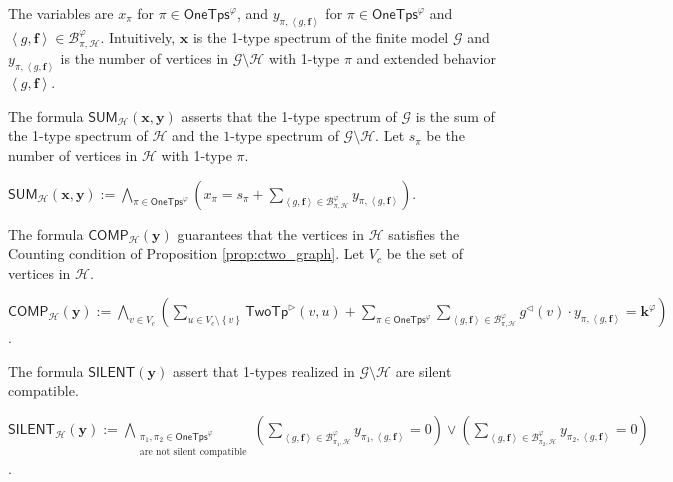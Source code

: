 \documentclass[10pt,a4paper]{article}
\theoremstyle{definition}
\theoremstyle{remark}
\newcommand{\cB}{\mathcal{B}}
\newcommand{\cG}{\mathcal{G}}
\newcommand{\cH}{\mathcal{H}}
\newcommand{\bff}{\mathbf{f}}
\newcommand{\bfk}{\mathbf{k}}
\newcommand{\bfx}{\mathbf{x}}
\newcommand{\bfy}{\mathbf{y}}
\newcommand{\twotypeof}{\mathsf{TwoTp}}
\newcommand{\onetypes}{\mathsf{OneTps}}
\newcommand{\set}[1]         {\left\{ #1 \right\}}
\newcommand{\tuple}[1]       {\left\langle #1 \right\rangle}
\newcommand{\trif} {\triangleright}
\newcommand{\trib} {\triangleleft}
\newcommand{\summ}  {\mathsf{SUM}}
\newcommand{\comp}  {\mathsf{COMP}}
\newcommand{\silent}  {\mathsf{SILENT}}
\begin{document}
\begin{compactitem}
    \item The variables are $x_\pi$ for $\pi \in \onetypes^\varphi$,
    and $y_{\pi, \tuple{g, \bff}}$ for $\pi \in \onetypes^\varphi$ and $\tuple{g, \bff} \in \cB^\varphi_{\pi, \cH}$.
    Intuitively, $\bfx$ is the 1-type spectrum of the finite model $\cG$ and $y_{\pi, \tuple{g, \bff}}$ is the number of vertices in $\cG \setminus \cH$ with 1-type $\pi$ and extended behavior $\tuple{g, \bff}$.
    \item
    The formula $\summ_{\cH}(\bfx, \bfy)$ asserts that the 1-type spectrum of $\cG$ is the sum of the 1-type spectrum of $\cH$ and 
    the $1$-type spectrum of $\cG \setminus \cH$.
    Let $s_\pi$ be the number of vertices in $\cH$ with 1-type $\pi$. \\
    \begin{notsotiny}
    $\displaystyle\summ_{\cH}(\bfx, \bfy)
         := 
     \bigwedge_{\pi \in \onetypes^\varphi} \left(x_\pi = s_\pi + \sum_{\tuple{g, \bff} \in \cB^{\varphi}_{\pi, \cH}} y_{\pi, \tuple{g, \bff}}\right)$.
    \end{notsotiny}
    \item
    The formula $\comp_{\cH}(\bfy)$ guarantees that the vertices in $\cH$ satisfies the Counting condition of Proposition \ref{prop:ctwo_graph}.
    Let $V_c$ be the set of vertices in $\cH$. \\
    \begin{notsotiny}
    $\displaystyle\comp_{\cH}(\bfy)
         := 
        \bigwedge_{v \in V_c} \left(
            \sum_{u \in V_c \setminus \set{v}} \twotypeof^\trif(v, u) +
            \sum_{\pi \in \onetypes^\varphi} \sum_{\tuple{g, \bff} \in \cB^{\varphi}_{\pi, \cH}} g^\trib(v) \cdot y_{\pi, \tuple{g, \bff}}
        = \bfk^\varphi \right)$.
        \end{notsotiny}
    \item
    The formula $\silent(\bfy)$ assert that 1-types realized in $\cG \setminus \cH$ are silent compatible. \\
    \begin{notsotiny}
    $\displaystyle\silent_{\cH}(\bfy)
         := 
        \bigwedge_{\substack{\pi_1, \pi_2 \in \onetypes^\varphi \\ \text{are not silent compatible}}}
        \left(\sum_{\tuple{g, \bff} \in \cB^{\varphi}_{\pi_1, \cH}} y_{\pi_1, \tuple{g, \bff}} = 0\right) \lor
        \left(\sum_{\tuple{g, \bff} \in \cB^{\varphi}_{\pi_2, \cH}} y_{\pi_2, \tuple{g, \bff}} = 0\right)$.
        \end{notsotiny}

\end{compactitem}
\end{document}
